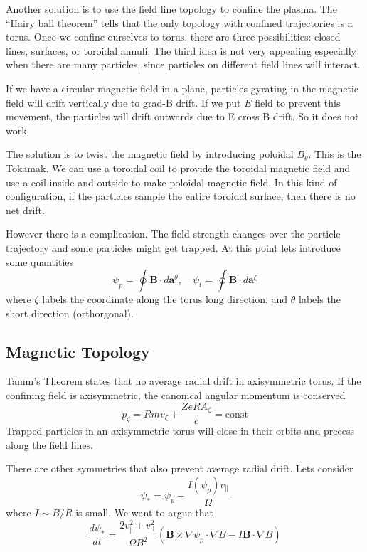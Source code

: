 \documentclass[letterpaper, 11pt]{article}
\numberwithin{equation}{section}
\numberwithin{figure}{section}
\begin{document}
Another solution is to use the field line topology to confine the plasma. The
``Hairy ball theorem'' tells that the only topology with confined trajectories
is a torus. Once we confine ourselves to torus, there are three possibilities:
closed lines, surfaces, or toroidal annuli. The third idea is not very appealing
especially when there are many particles, since particles on different field
lines will interact.

If we have a circular magnetic field in a plane, particles gyrating in the
magnetic field will drift vertically due to grad-B drift. If we put $E$ field to
prevent this movement, the particles will drift outwards due to E cross B drift.
So it does not work.

The solution is to twist the magnetic field by introducing poloidal
$B_{\theta}$. This is the Tokamak. We can use a toroidal coil to provide the
toroidal magnetic field and use a coil inside and outside to make poloidal
magnetic field. In this kind of configuration, if the particles sample the
entire toroidal surface, then there is no net drift.

However there is a complication. The field strength changes over the particle
trajectory and some particles might get trapped. At this point lets introduce
some quantities
\begin{equation}
  \label{eq:4}
  \psi_p = \oint \mathbf{B}\cdot d\mathbf{a}^{\theta},\quad \psi_t = \oint \mathbf{B}\cdot d\mathbf{a}^{\zeta}
\end{equation}
where $\zeta$ labels the coordinate along the torus long direction, and $\theta$
labels the short direction (orthorgonal).



\subsection{Magnetic Topology}

Tamm's Theorem states that no average radial drift in axisymmetric torus. If the
confining field is axisymmetric, the canonical angular momentum is conserved
\begin{equation}
  \label{eq:5}
  p_{\zeta} = Rmv_{\zeta} + \frac{ZeRA_{\zeta}}{c} = \mathrm{const}
\end{equation}
Trapped particles in an axisymmetric torus will close in their orbits and
precess along the field lines. 

There are other symmetries that also prevent average radial drift. Lets consider
\begin{equation}
  \label{eq:6}
\psi_{*} = \psi_p - \frac{I(\psi_p)v_{\parallel}}{\Omega}
\end{equation}
where $I\sim B/R$ is small. We want to argue that
\begin{equation}
  \label{eq:7}
  \frac{d\psi_{*}}{dt} = \frac{2v_{\parallel}^2 + v_{\perp}^2}{\Omega B^2}\left( \mathbf{B}\times\nabla\psi_p\cdot\nabla B - I\mathbf{B}\cdot\nabla B \right)
\end{equation}
\end{document}
